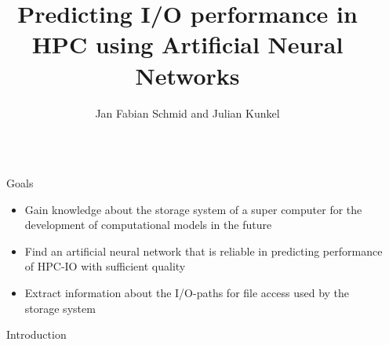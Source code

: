 \documentclass[final]{beamer}
\title{Predicting I/O performance in HPC using Artificial Neural Networks} %
\author{Jan Fabian Schmid and Julian Kunkel} %
\institute{Universität Hamburg} %
\newlength{\sepwid}
\newlength{\onecolwid}
\begin{document}

\setlength{\belowcaptionskip}{2ex} %
\setlength\belowdisplayshortskip{2ex} %

\begin{frame}[t] %

\begin{columns}[t] %

\begin{column}{\sepwid}\end{column} %

\begin{column}{\onecolwid} %


\begin{alertblock}{Goals}


\begin{itemize}
\item Gain knowledge about the storage system of a super computer for the development of computational models in the future
\item Find an artificial neural network that is reliable in predicting performance of HPC-IO with sufficient quality
\item Extract information about the I/O-paths for file access used by the storage system
\end{itemize}

\end{alertblock}


\begin{block}{Introduction}
	

\end{block}
\end{column}
\end{columns}
\end{frame}
\end{document}
